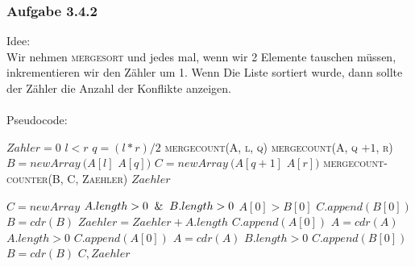 \documentclass{article}
\begin{document}
\subsubsection{Aufgabe 3.4.2}
    Idee:\\
    Wir nehmen \textsc{mergesort} und jedes mal, wenn wir 2 Elemente tauschen müssen, inkrementieren wir den Zähler um 1.
    Wenn Die Liste sortiert wurde, dann sollte der Zähler die Anzahl der Konflikte anzeigen.\\
    \\
    Pseudocode:\\
    \begin{codebox}
        \li $Zahler = 0$
        \li \If $l < r$
        \Indentmore
            \li $q = (l * r) / 2$
            \li \textsc{mergecount(A, l, q)}
            \li \textsc{mergecount(A, q $+ 1$, r)}
            \li $B = newArray~(A[l]$ \To $A[q])$
            \li $C = newArray~(A[q+1]$ \To $A[r])$
            \li \textsc{mergecount-counter(B, C, Zaehler)}
            \End
        \li \Return $Zaehler$
	\end{codebox}
	
    \begin{codebox}
        \li $C = newArray$
        \li \While $A.length > 0 \And B.length > 0$
        \Indentmore
            \li \If $A[0] > B[0]$
            \Indentmore
                \li $C.append(B [0])$
                \li $B = cdr(B)$
                \li $Zaehler = Zaehler + A.length$
                \li \Else
                \li $C.append(A [0])$
                \li $A = cdr(A)$
                \End
            \End
        \li \While $A.length > 0$
        \Indentmore
            \li $C.append(A [0])$
            \li $A = cdr(A)$
            \End
        \li \While $B.length > 0$
        \Indentmore
            \li $C.append(B [0])$
            \li $B = cdr(B)$
            \End
        \li \Return $C, Zaehler$
	\end{codebox}
\end{document}
